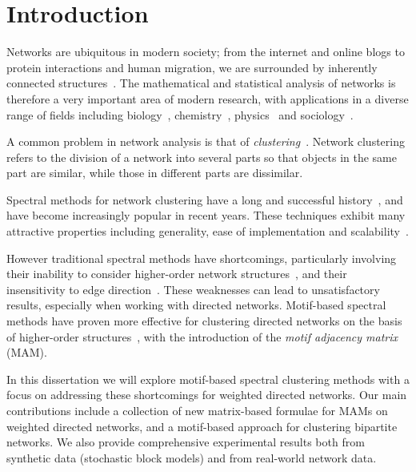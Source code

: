\chapter{Introduction}

Networks are ubiquitous in modern society; from the internet and online blogs to protein interactions and human migration, we are surrounded by inherently connected structures~\cite{kolaczyk2014statistical}.
The mathematical and statistical analysis of networks is therefore a very important area of modern research, with applications in a diverse range of fields including biology~\cite{albert2005scale}, chemistry~\cite{jacob2018statistics}, physics~\cite{newman2008physics} and sociology~\cite{adamic2005political}.


A common problem in network analysis is that of \emph{clustering}~\cite{schaeffer2007graph}.
Network clustering refers to the division of a network into several parts so that objects in the same part are similar, while those in different parts are dissimilar.


Spectral methods for network clustering have a long and successful history~\cite{cheeger1969lower,donath1972algorithms,guattery1995performance}, and have become increasingly popular in recent years.
These techniques exhibit many attractive properties including generality, ease of implementation and scalability~\cite{von2007tutorial}. 


However traditional spectral methods have shortcomings, particularly involving their inability to consider higher-order network structures~\cite{benson2016higher}, and their insensitivity to edge direction~\cite{DirectedClustImbCuts}. These weaknesses can lead to unsatisfactory results, especially when working with directed networks.
Motif-based spectral methods have proven more effective for clustering directed networks on the basis of higher-order structures~\cite{tsourakakis2017scalable}, with the introduction of the \emph{motif adjacency matrix} (MAM). 


In this dissertation we will explore motif-based spectral clustering methods with a focus on addressing these shortcomings for weighted directed networks.
Our main contributions include a collection of new matrix-based formulae for MAMs on weighted directed networks, and a motif-based approach for clustering bipartite networks. We also provide comprehensive experimental results both from synthetic data (stochastic block models) and from real-world network data.






